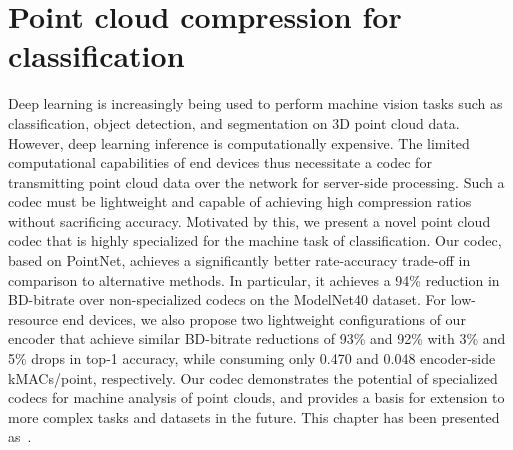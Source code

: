 \chapter{Point cloud compression for classification}
\label{ch:point_cloud_compression}

\begingroup

\setlength\aboverulesep{0.3827ex+0.1\normalbaselineskip}
\setlength\belowrulesep{0.6219ex+0.1\normalbaselineskip}






%
%
%


\begin{chapabstract}
  Deep learning is increasingly being used to perform machine vision tasks such as classification, object detection, and segmentation on 3D point cloud data.
  However, deep learning inference is computationally expensive.
  The limited computational capabilities of end devices thus necessitate a codec for transmitting point cloud data over the network for server-side processing.
  Such a codec must be lightweight and capable of achieving high compression ratios without sacrificing accuracy.
  Motivated by this, we present a novel point cloud codec that is highly specialized for the machine task of classification.
  Our codec, based on PointNet, achieves a significantly better rate-accuracy trade-off in comparison to alternative methods.
  In particular, it achieves a 94\% reduction in BD-bitrate over non-specialized codecs on the ModelNet40 dataset.
  For low-resource end devices, we also propose two lightweight configurations of our encoder that achieve similar BD-bitrate reductions of 93\% and 92\% with 3\% and 5\% drops in top-1 accuracy, while consuming only 0.470 and 0.048 encoder-side kMACs/point, respectively.
  Our codec demonstrates the potential of specialized codecs for machine analysis of point clouds, and provides a basis for extension to more complex tasks and datasets in the future.
  This chapter has been presented as~\cite{ulhaq2023pointcloud}.
\end{chapabstract}




